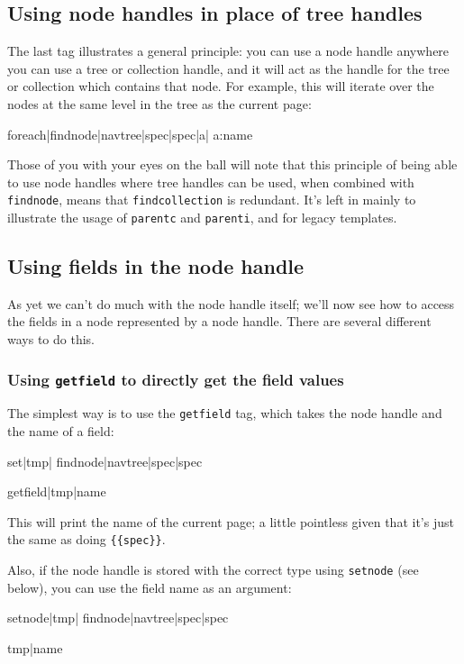 \subsection{Using node handles in place of tree handles}
The last tag illustrates a general principle: you can use a node handle anywhere you 
can use a tree or collection handle, and it will act as the handle for the tree or collection
which contains that node. For example, this will iterate over the nodes at the same level
in the tree as the current page:
\begin{MyVerbatim}
{{foreach|{{findnode|{{navtree}}|spec|{{spec}}}}|a|
    {{a:name}}
}}
\end{MyVerbatim}
Those of you with your eyes on the ball will note that this principle of being able to use
node handles where tree handles can be used, when combined with \texttt{findnode}, means that
\texttt{findcollection} is redundant. It's left in mainly to illustrate the usage of \texttt{parentc}
and \texttt{parenti}, and for legacy templates.

\subsection{Using fields in the node handle}
As yet we can't do much with the node handle itself; we'll now see how to access the fields in
a node represented by a node handle. There are several different ways to do this.

\subsubsection{Using \texttt{getfield} to directly get the field values}
\label{fieldget}
The simplest way is to use the \texttt{getfield}
tag, which takes the node handle and the name of a field:
\begin{MyVerbatim}
{{set|tmp|
    {{findnode|{{navtree}}|spec|{{spec}}}}}}

{{getfield|{{tmp}}|name}}
\end{MyVerbatim}
This will print the name of the current page; a little pointless given that it's just the same
as doing \verb,{{spec}},.

Also, if the node handle is stored with the correct type using \texttt{setnode} (see below),
you can use the field name as an argument:
\begin{MyVerbatim}
{{setnode|tmp|
    {{findnode|{{navtree}}|spec|{{spec}}}}}}

{{tmp|name}}
\end{MyVerbatim}

